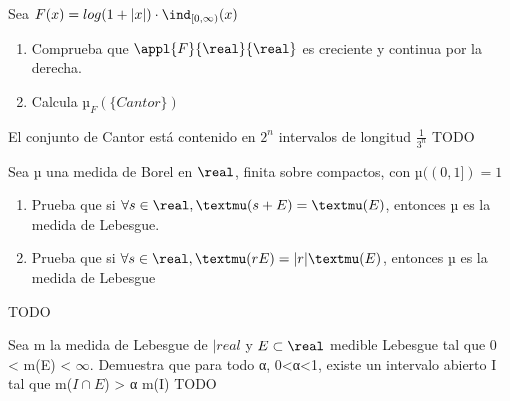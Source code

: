 \begin{problem}
Sea $F(x)=log(1 + |x|)\cdot \ind_{[0, \infty)}(x)$
\begin{enumerate}
\item Comprueba que $\appl{F}{\real}{\real}$ es creciente y continua por la derecha.
\item Calcula $µ_F(\{Cantor\})$
\end{enumerate}
\obs El conjunto de Cantor está contenido en $2^n$ intervalos de longitud $\frac{1}{3^n}$
\solution
TODO
\end{problem}

\begin{problem}
Sea µ una medida de Borel en $\real$, finita sobre compactos, con $µ((0, 1])=1$
\begin{enumerate}
\item Prueba que si $\forall s \in \real, µ(s + E)=µ(E)$, entonces µ es la medida de Lebesgue.
\item Prueba que si $\forall s \in \real, µ(rE)=|r|µ(E)$, entonces µ es la medida de Lebesgue
\end{enumerate}
\solution
TODO
\end{problem}

\begin{problem}
Sea m la medida de Lebesgue de $|real$ y $E \subset \real$ medible Lebesgue tal que 0 < m(E) < $\infty$. Demuestra que para todo α, 0<α<1, existe un intervalo abierto I tal que m($I \cap E$) > α m(I)
\solution
TODO
\end{problem}
